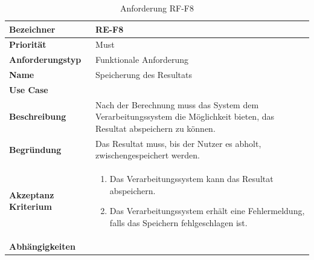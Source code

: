 \begin{table}[ht]
\centering
  \begin{tabular}{ l | p{8cm} }
	\hline
	\rowcolor{gray}
	\textbf{Bezeichner}&	\textbf{RE-F8}\\ \hline
	\textbf{Priorität} 		&	Must\\ \hline
	\textbf{Anforderungstyp}	&	Funktionale Anforderung\\ \hline
	\textbf{Name} 			&	Speicherung des Resultats\\ \hline
	\textbf{Use Case} 		&	\nameref{table:use_case_5}\\ \hline
	\textbf{Beschreibung} 	&	Nach der Berechnung muss das System dem Verarbeitungssystem die Möglichkeit bieten, das Resultat abspeichern zu können.\\ \hline
	\textbf{Begründung} 		&	Das Resultat muss, bis der Nutzer es abholt, zwischengespeichert werden.\\ \hline
	\textbf{Akzeptanz Kriterium}	&	\begin{enumerate}
					\item Das Verarbeitungssystem kann das Resultat abspeichern.
					\item Das Verarbeitungssystem erhält eine Fehlermeldung, falls das Speichern fehlgeschlagen ist.
					\end{enumerate}
					\\ \hline
	\textbf{Abhängigkeiten} 	&	\nameref{table:req_4}\\ \hline
  \end{tabular}
   \caption{Anforderung RF-F8}\label{table:req_8}
\end{table}

